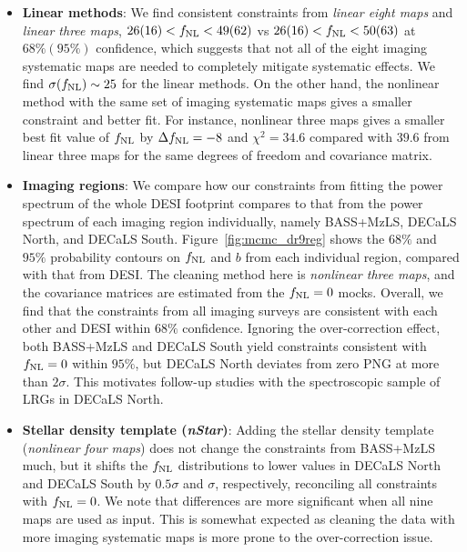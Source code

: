 \begin{itemize}[itemindent=*]

\item \textbf{Linear methods}: We find consistent constraints from \textit{linear eight maps} and \textit{linear three maps}, $26(16)<f_{\rm NL}<49(62)$ vs $26(16)<f_{\rm NL}<50(63)$ at $68\%(95\%)$ confidence, which suggests that not all of the eight imaging systematic maps are needed to completely mitigate systematic effects. We find $\sigma (f_{\rm NL}) \sim 25$ for the linear methods. On the other hand, the nonlinear method with the same set of imaging systematic maps gives a smaller constraint and better fit. For instance, nonlinear three maps gives a smaller best fit value of $f_{\rm NL}$ by $\Delta f_{\rm NL} = -8$ and $\chi^{2} = 34.6$ compared with $39.6$ from linear three maps for the same degrees of freedom and covariance matrix.

\item \textbf{Imaging regions}: We compare how our constraints from fitting the power spectrum of the whole DESI footprint compares to that from the power spectrum of each imaging region individually, namely BASS+MzLS, DECaLS North, and DECaLS South. Figure~\ref{fig:mcmc_dr9reg} shows the $68\%$ and $95\%$ probability contours on $f_{\rm NL}$ and $b$ from each individual region, compared with that from DESI. The cleaning method here is \textit{nonlinear three maps}, and the covariance matrices are estimated from the $f_{\rm NL}=0$ mocks. Overall, we find that the constraints from all imaging surveys are consistent with each other and DESI within $68\%$ confidence. Ignoring the over-correction effect, both BASS+MzLS and DECaLS South yield constraints consistent with $f_{\rm NL}=0$ within $95\%$, but DECaLS North deviates from zero PNG at more than $2\sigma$. This motivates follow-up studies with the spectroscopic sample of LRGs in DECaLS North. 

\item \textbf{Stellar density template (\textit{nStar})}: Adding the stellar density template (\textit{nonlinear four maps}) does not change the constraints from BASS+MzLS much, but it shifts the $f_{\rm NL}$ distributions to lower values in DECaLS North and DECaLS South by $0.5\sigma$ and $\sigma$, respectively, reconciling all constraints with $f_{\rm NL}=0$. We note that differences are more significant when all nine maps are used as input. This is somewhat expected as cleaning the data with more imaging systematic maps is more prone to the over-correction issue.  


\end{itemize}
